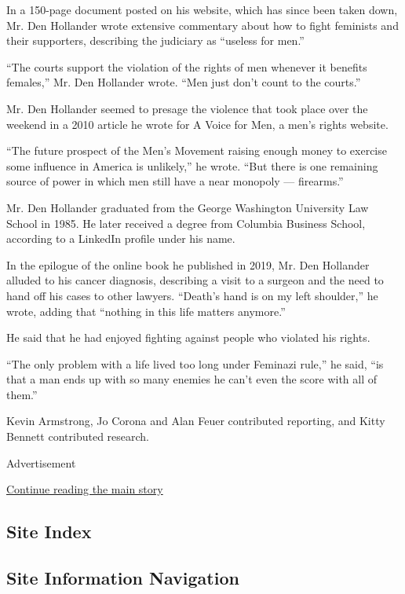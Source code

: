 In a 150-page document posted on his website, which has since been taken
down, Mr. Den Hollander wrote extensive commentary about how to fight
feminists and their supporters, describing the judiciary as ``useless
for men.''

``The courts support the violation of the rights of men whenever it
benefits females,'' Mr. Den Hollander wrote. ``Men just don't count to
the courts.''

Mr. Den Hollander seemed to presage the violence that took place over
the weekend in a 2010 article he wrote for A Voice for Men, a men's
rights website.

``The future prospect of the Men's Movement raising enough money to
exercise some influence in America is unlikely,'' he wrote. ``But there
is one remaining source of power in which men still have a near monopoly
--- firearms.''

Mr. Den Hollander graduated from the George Washington University Law
School in 1985. He later received a degree from Columbia Business
School, according to a LinkedIn profile under his name.

In the epilogue of the online book he published in 2019, Mr. Den
Hollander alluded to his cancer diagnosis, describing a visit to a
surgeon and the need to hand off his cases to other lawyers. ``Death's
hand is on my left shoulder,'' he wrote, adding that ``nothing in this
life matters anymore.''

He said that he had enjoyed fighting against people who violated his
rights.

``The only problem with a life lived too long under Feminazi rule,'' he
said, ``is that a man ends up with so many enemies he can't even the
score with all of them.''

Kevin Armstrong, Jo Corona and Alan Feuer contributed reporting, and
Kitty Bennett contributed research.

Advertisement

\protect\hyperlink{after-bottom}{Continue reading the main story}

\hypertarget{site-index}{%
\subsection{Site Index}\label{site-index}}

\hypertarget{site-information-navigation}{%
\subsection{Site Information
Navigation}\label{site-information-navigation}}

